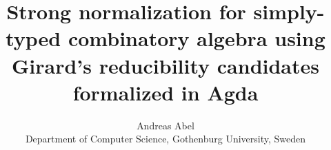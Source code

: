 \documentclass[a4paper]{scrartcl}
\title{Strong normalization for simply-typed combinatory algebra
using Girard's reducibility candidates formalized in Agda}
\author{Andreas Abel
  \\ Department of Computer Science,
    Gothenburg University,
    Sweden
  }
\begin{document}
\maketitle

\begin{abstract}
\end{abstract}






% 





% 

\end{document}
